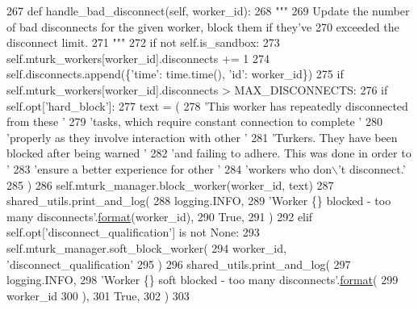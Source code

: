 \begin{DoxyCode}
267     \textcolor{keyword}{def }handle\_bad\_disconnect(self, worker\_id):
268         \textcolor{stringliteral}{"""}
269 \textcolor{stringliteral}{        Update the number of bad disconnects for the given worker, block them if they've}
270 \textcolor{stringliteral}{        exceeded the disconnect limit.}
271 \textcolor{stringliteral}{        """}
272         \textcolor{keywordflow}{if} \textcolor{keywordflow}{not} self.is\_sandbox:
273             self.mturk\_workers[worker\_id].disconnects += 1
274             self.disconnects.append(\{\textcolor{stringliteral}{'time'}: time.time(), \textcolor{stringliteral}{'id'}: worker\_id\})
275             \textcolor{keywordflow}{if} self.mturk\_workers[worker\_id].disconnects > MAX\_DISCONNECTS:
276                 \textcolor{keywordflow}{if} self.opt[\textcolor{stringliteral}{'hard\_block'}]:
277                     text = (
278                         \textcolor{stringliteral}{'This worker has repeatedly disconnected from these '}
279                         \textcolor{stringliteral}{'tasks, which require constant connection to complete '}
280                         \textcolor{stringliteral}{'properly as they involve interaction with other '}
281                         \textcolor{stringliteral}{'Turkers. They have been blocked after being warned '}
282                         \textcolor{stringliteral}{'and failing to adhere. This was done in order to '}
283                         \textcolor{stringliteral}{'ensure a better experience for other '}
284                         \textcolor{stringliteral}{'workers who don\(\backslash\)'t disconnect.'}
285                     )
286                     self.mturk\_manager.block\_worker(worker\_id, text)
287                     shared\_utils.print\_and\_log(
288                         logging.INFO,
289                         \textcolor{stringliteral}{'Worker \{\} blocked - too many disconnects'}.\hyperlink{namespaceparlai_1_1chat__service_1_1services_1_1messenger_1_1shared__utils_a32e2e2022b824fbaf80c747160b52a76}{format}(worker\_id),
290                         \textcolor{keyword}{True},
291                     )
292                 \textcolor{keywordflow}{elif} self.opt[\textcolor{stringliteral}{'disconnect\_qualification'}] \textcolor{keywordflow}{is} \textcolor{keywordflow}{not} \textcolor{keywordtype}{None}:
293                     self.mturk\_manager.soft\_block\_worker(
294                         worker\_id, \textcolor{stringliteral}{'disconnect\_qualification'}
295                     )
296                     shared\_utils.print\_and\_log(
297                         logging.INFO,
298                         \textcolor{stringliteral}{'Worker \{\} soft blocked - too many disconnects'}.\hyperlink{namespaceparlai_1_1chat__service_1_1services_1_1messenger_1_1shared__utils_a32e2e2022b824fbaf80c747160b52a76}{format}(
299                             worker\_id
300                         ),
301                         \textcolor{keyword}{True},
302                     )
303 
\end{DoxyCode}
